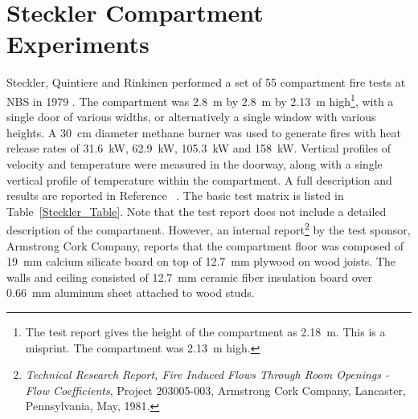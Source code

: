 \section{Steckler Compartment Experiments}

Steckler, Quintiere and Rinkinen performed a set of 55 compartment fire tests at NBS in 1979 \cite{Steckler:1982}. The compartment was 2.8~m by 2.8~m by 2.13~m high\footnote{The test report
gives the height of the compartment as 2.18~m. This is a misprint. The compartment was 2.13~m high.}, with a single door of
various widths, or alternatively a single window with various heights. A 30~cm diameter methane burner was used to generate fires with heat release rates of
31.6~kW, 62.9~kW, 105.3~kW and 158~kW. Vertical profiles of velocity and temperature were measured in the doorway, along with a single vertical profile of temperature
within the compartment.
A full description and results are reported in Reference~ \cite{Steckler:1982}. The basic test matrix is listed in Table~\ref{Steckler_Table}. Note that the
test report does not include a detailed description of the compartment. However, an internal report\footnote{ {\em Technical Research Report, Fire Induced Flows
Through Room Openings - Flow Coefficients}, Project 203005-003, Armstrong Cork Company, Lancaster, Pennsylvania, May, 1981.} by the test sponsor, Armstrong Cork Company,
reports that the compartment floor was composed of 19~mm calcium silicate board on top of 12.7~mm plywood on wood joists. The walls and ceiling consisted of
12.7~mm ceramic fiber insulation board over 0.66~mm aluminum sheet attached to wood studs.

